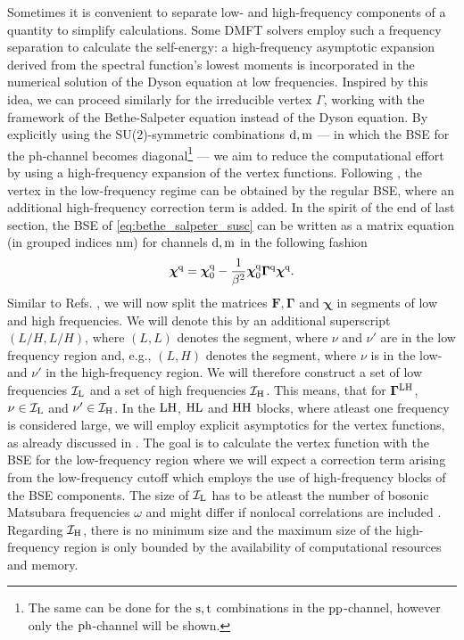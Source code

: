 \documentclass[../../main.tex]{subfiles}
\begin{document}
Sometimes it is convenient to separate low- and high-frequency components of a quantity to simplify calculations. Some DMFT solvers \cite{parragh} employ such a frequency separation to calculate the self-energy: a high-frequency asymptotic expansion derived from the spectral function's lowest moments is incorporated in the numerical solution of the Dyson equation at low frequencies. Inspired by this idea, we can proceed similarly for the irreducible vertex $\Gamma$, working with the framework of the Bethe-Salpeter equation instead of the Dyson equation. By explicitly using the SU(2)-symmetric combinations $\text{d}, \text{m}$ --- in which the BSE for the ph-channel becomes diagonal\footnote{The same can be done for the $\text{s}, \text{t}$ combinations in the $\text{pp}$-channel, however only the $\text{ph}$-channel will be shown.} --- we aim to reduce the computational effort by using a high-frequency expansion of the vertex functions. Following \cite{kunes asympt, hummel DA, efficient BSE}, the vertex in the low-frequency regime can be obtained by the regular BSE, where an additional high-frequency correction term is added. In the spirit of the end of last section, the BSE of \eqref{eq:bethe_salpeter_susc} can be written as a matrix equation (in grouped indices $\text{nm}$) for channels $\text{d}, \text{m}$ in the following fashion
\begin{align}\label{eq:bse_matrix}
	\bm{\chi}^{\text{q}}=\bm{\chi}_{0}^{\text{q}}-\frac{1}{\beta^2} \bm{\chi}_{0}^{\text{q}}\bm{\Gamma}^{\text{q}}\bm{\chi}^{\text{q}}.
\end{align}
Similar to Refs. \cite{kunes, hummel DA, efficient BSE}, we will now split the matrices $\bm{F}, \bm{\Gamma}$ and $\bm{\chi}$ in segments of low and high frequencies. We will denote this by an additional superscript $(L/H, L/H)$, where $(L,L)$ denotes the segment, where $\nu$ and $\nu'$ are in the low frequency region and, e.g., $(L,H)$ denotes the segment, where $\nu$ is in the low- and $\nu'$ in the high-frequency region. We will therefore construct a set of low frequencies $\mathcal{I}_{\text{L}}$ and a set of high frequencies $\mathcal{I}_{\text{H}}$. This means, that for $\bm\Gamma^{\text{L}\text{H}}$, $\nu\in\mathcal{I}_{\text{L}}$ and $\nu'\in\mathcal{I}_{\text{H}}$. In the $\text{L}\text{H}$, $\text{H}\text{L}$ and $\text{H}\text{H}$ blocks, where atleast one frequency is considered large, we will employ explicit asymptotics for the vertex functions, as already discussed in . The goal is to calculate the vertex function with the BSE for the low-frequency region where we will expect a correction term arising from the low-frequency cutoff which employs the use of high-frequency blocks of the BSE components. The size of $\mathcal{I}_{\text{L}}$ has to be atleast the number of bosonic Matsubara frequencies $\omega$ \cite{efficient BSE} and might differ if nonlocal correlations are included \cite{kinza two-particle corr}. Regarding $\mathcal{I}_{\text{H}}$, there is no minimum size and the maximum size of the high-frequency region is only bounded by the availability of computational resources and memory. 
\end{document}
